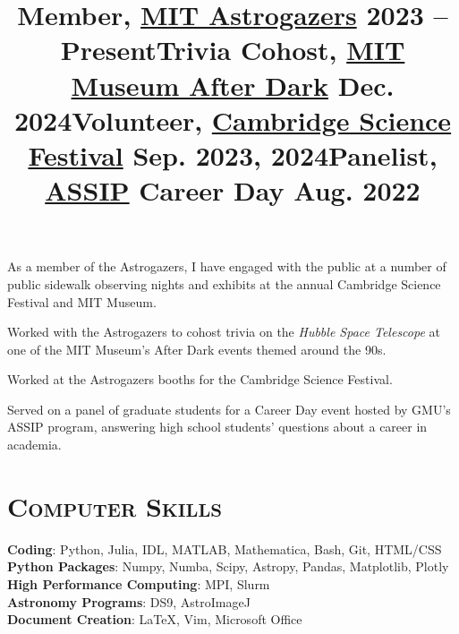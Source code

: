 \documentclass[marg, centered]{res}
\begin{document}
\begin{resume}
\title{\textbf{Member}, \href{https://astrogazers.mit.edu/}{\color{dkbu} MIT Astrogazers} \hfill \textbf{2023 -- Present}}
\begin{position}
{\small As a member of the Astrogazers, I have engaged with the public at a number of public sidewalk observing nights and exhibits at the annual Cambridge Science Festival and MIT Museum.}
\end{position}

\vspace{-0.2cm}
\title{\textbf{Trivia Cohost}, \href{https://mitmuseum.mit.edu/programs/mit-museum-after-dark}{\color{dkbu} MIT Museum After Dark} \hfill \textbf{Dec. 2024}}
\begin{position}
{\small Worked with the Astrogazers to cohost trivia on the \textit{Hubble Space Telescope} at one of the MIT Museum's After Dark events themed around the 90s.}
\end{position}

\vspace{-0.2cm}
\title{\textbf{Volunteer}, \href{https://cambridgesciencefestival.org/}{\color{dkbu} Cambridge Science Festival} \hfill \textbf{Sep. 2023, 2024}}
\begin{position}
{\small Worked at the Astrogazers booths for the Cambridge Science Festival.}
\end{position}

\vspace{-0.2cm}
\title{\textbf{Panelist}, \href{https://science.gmu.edu/assip}{\color{dkbu} ASSIP} Career Day \hfill \textbf{Aug. 2022}}
\begin{position}
{\small Served on a panel of graduate students for a Career Day event hosted by GMU's ASSIP program, answering high school students' questions about a career in academia.}
\end{position}


\section{\scshape \bfseries Computer Skills}

\textbf{Coding}{: Python, Julia, IDL, MATLAB, Mathematica, Bash, Git, HTML/CSS} \\ 
\textbf{Python Packages}{: Numpy, Numba, Scipy, Astropy, Pandas, Matplotlib, Plotly} \\
\textbf{High Performance Computing}{: MPI, Slurm} \\
\textbf{Astronomy Programs}{: DS9, AstroImageJ} \\
\textbf{Document Creation}{: \LaTeX, Vim, Microsoft Office} \\



\end{resume}
\end{document}
